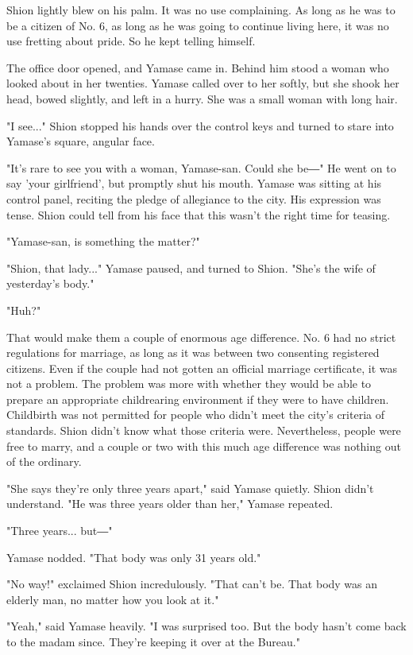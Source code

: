 Shion lightly blew on his palm. It was no use complaining. As long as he
was to be a citizen of No. 6, as long as he was going to continue living
here, it was no use fretting about pride. So he kept telling himself.

The office door opened, and Yamase came in. Behind him stood a woman who
looked about in her twenties. Yamase called over to her softly, but she
shook her head, bowed slightly, and left in a hurry. She was a small
woman with long hair.

"I see..." Shion stopped his hands over the control keys and turned to
stare into Yamase's square, angular face.

"It's rare to see you with a woman, Yamase-san. Could she be―" He went
on to say 'your girlfriend', but promptly shut his mouth. Yamase was
sitting at his control panel, reciting the pledge of allegiance to the
city. His expression was tense. Shion could tell from his face that this
wasn't the right time for teasing.

"Yamase-san, is something the matter?"

"Shion, that lady..." Yamase paused, and turned to Shion. "She's the
wife of yesterday's body."

"Huh?"

That would make them a couple of enormous age difference. No. 6 had no
strict regulations for marriage, as long as it was between two
consenting registered citizens. Even if the couple had not gotten an
official marriage certificate, it was not a problem. The problem was
more with whether they would be able to prepare an appropriate
childrearing environment if they were to have children. Childbirth was
not permitted for people who didn't meet the city's criteria of
standards. Shion didn't know what those criteria were. Nevertheless,
people were free to marry, and a couple or two with this much age
difference was nothing out of the ordinary.

"She says they're only three years apart," said Yamase quietly. Shion
didn't understand. "He was three years older than her," Yamase repeated.

"Three years... but―"

Yamase nodded. "That body was only 31 years old."

"No way!" exclaimed Shion incredulously. "That can't be. That body was
an elderly man, no matter how you look at it."

"Yeah," said Yamase heavily. "I was surprised too. But the body hasn't
come back to the madam since. They're keeping it over at the Bureau."

